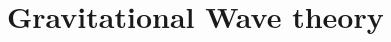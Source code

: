 \documentclass[main.tex]{subfiles}
\begin{document}
\section{Gravitational Wave theory}
\end{document}
